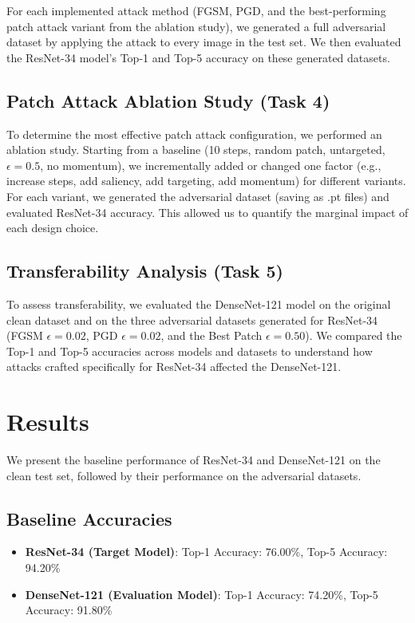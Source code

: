 \documentclass[letterpaper]{article}
\begin{document}
For each implemented attack method (FGSM, PGD, and the best-performing patch attack variant from the ablation study), we generated a full adversarial dataset by applying the attack to every image in the test set. We then evaluated the ResNet-34 model's Top-1 and Top-5 accuracy on these generated datasets.

\subsection{Patch Attack Ablation Study (Task 4)}
To determine the most effective patch attack configuration, we performed an ablation study. Starting from a baseline (10 steps, random patch, untargeted, $\epsilon=0.5$, no momentum), we incrementally added or changed one factor (e.g., increase steps, add saliency, add targeting, add momentum) for different variants. For each variant, we generated the adversarial dataset (saving as .pt files) and evaluated ResNet-34 accuracy. This allowed us to quantify the marginal impact of each design choice.

\subsection{Transferability Analysis (Task 5)}
To assess transferability, we evaluated the DenseNet-121 model on the original clean dataset and on the three adversarial datasets generated for ResNet-34 (FGSM $\epsilon=0.02$, PGD $\epsilon=0.02$, and the Best Patch $\epsilon=0.50$). We compared the Top-1 and Top-5 accuracies across models and datasets to understand how attacks crafted specifically for ResNet-34 affected the DenseNet-121.

\section{Results}
We present the baseline performance of ResNet-34 and DenseNet-121 on the clean test set, followed by their performance on the adversarial datasets.

\subsection{Baseline Accuracies}
\begin{itemize}
    \item \textbf{ResNet-34 (Target Model)}: Top-1 Accuracy: 76.00\%, Top-5 Accuracy: 94.20\%
    \item \textbf{DenseNet-121 (Evaluation Model)}: Top-1 Accuracy: 74.20\%, Top-5 Accuracy: 91.80\%
\end{itemize}
\end{document}

